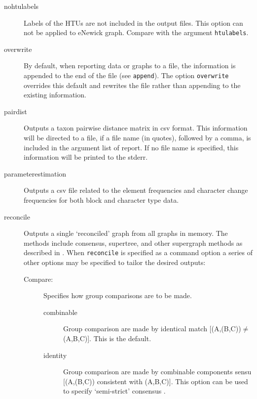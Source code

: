 \begin{description}
		\item[nohtulabels] Labels of the HTUs are not included in the output files. 
		This option can not be applied to eNewick graph. Compare with the argument 
		\texttt{htulabels}.
		
		\item[overwrite] By default, when reporting data or graphs to a file, the 
		information is appended to the end of the file (see \texttt{append}). The 
		option \texttt{overwrite} overrides this default and rewrites the file rather 
		than appending to the existing information.

		\item[pairdist] Outputs a taxon pairwise distance matrix in csv format. 
		This information will be directed to a file, if a file name (in quotes), followed 
		by a comma, is included in the argument list of report. If no file name is 
		specified, this information will be printed to the stderr.
		
		\item[parameterestimation] Outputs a csv file related to the element
		frequencies and character change frequencies for both block and character
		type data.
		
		\item[reconcile] Outputs a single `reconciled' graph from all graphs in 
		memory. The methods include consensus, supertree, and other supergraph 
		methods as described in \cite{Wheeler2012, Wheeler2022}. When \texttt{reconcile} 
		is specified as a command option a series of other options may be specified 
		to tailor the desired outputs:
		
		\begin{description}
		
			\item [Compare:] Specifies how group comparisons are to be made.
						
			\begin{description}
				\item[combinable] Group comparison are made by identical match 
				[(A,(B,C))$\neq$(A,B,C)]. This is the default.	
								
				\item[identity] Group comparison are made by combinable components sensu 
				     \cite{Nelson1979} [(A,(B,C)) consistent with (A,B,C)]. This option can be used 
				     to specify `semi-strict' consensus \citep{Bremer1990}.
				     
			\end{description}
			

\end{description}
\end{description}
